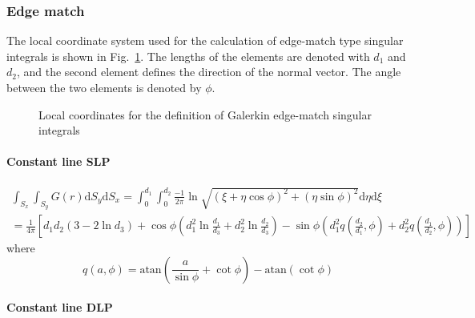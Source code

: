 \documentclass[a4paper,11pt]{article}
\newcommand{\td}{\mathrm{d}}
\newcommand{\atan}{\mathrm{atan}}
\begin{document}
\subsubsection{Edge match}

The local coordinate system used for the calculation of edge-match type singular integrals is shown in Fig.~\ref{fig:local_galerkin_edge}. The lengths of the elements are denoted with $d_1$ and $d_2$, and the second element defines the direction of the normal vector. The angle between the two elements is denoted by $\phi$.

\begin{figure}
\center
{}
\caption{Local coordinates for the definition of Galerkin edge-match singular integrals}
\label{fig:local_galerkin_edge}
\end{figure}

\paragraph{Constant line SLP}

\begin{multline}
\int_{S_{x}} \int_{S_{y}} G(r) \td S_y \td S_x =
\int_{0}^{d_1} \int_{0}^{d_2}
\frac{-1}{2\pi}\ln \sqrt{(\xi+\eta \cos\phi)^2 + (\eta\sin\phi)^2}
\td \eta \td \xi \\
=
\frac{1}{4 \pi}
\left[
d_1 d_2 \left(3 - 2 \ln d_3 \right)
+ \cos\phi \left(d_1^2 \ln \frac{d_1}{d_3} + d_2^2 \ln \frac{d_2}{d_3}\right)
- \sin\phi \left(d_1^2 q\left(\frac{d_2}{d_1}, \phi\right) + d_2^2 q\left(\frac{d_1}{d_2}, \phi\right)\right)
\right]
\end{multline}
%
where
%
\begin{equation}
q(a, \phi) = \atan\left(\frac{a}{\sin\phi} + \cot\phi\right) - \atan\left(\cot\phi\right)
\end{equation}

\paragraph{Constant line DLP}
\end{document}
